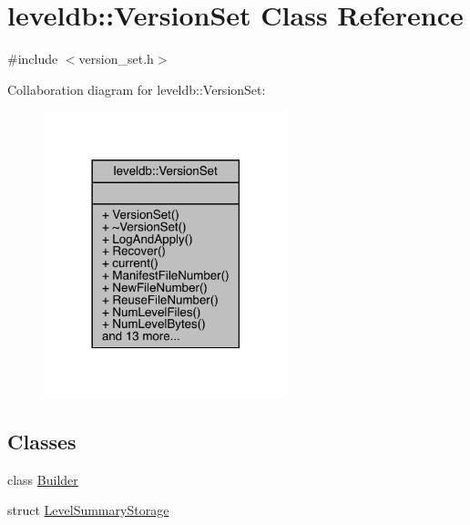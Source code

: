 \hypertarget{classleveldb_1_1_version_set}{}\section{leveldb\+::Version\+Set Class Reference}
\label{classleveldb_1_1_version_set}


{\ttfamily \#include $<$version\+\_\+set.\+h$>$}



Collaboration diagram for leveldb\+::Version\+Set\+:
\nopagebreak
\begin{figure}[H]
\begin{center}
\leavevmode
\includegraphics[width=201pt]{classleveldb_1_1_version_set__coll__graph}
\end{center}
\end{figure}
\subsection*{Classes}
\begin{DoxyCompactItemize}
\item 
class \mbox{\hyperlink{classleveldb_1_1_version_set_1_1_builder}{Builder}}
\item 
struct \mbox{\hyperlink{structleveldb_1_1_version_set_1_1_level_summary_storage}{Level\+Summary\+Storage}}
\end{DoxyCompactItemize}
